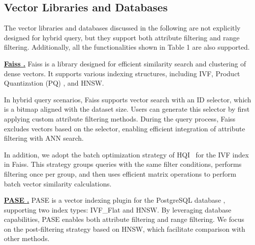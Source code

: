 \documentclass[sigconf, nonacm]{acmart}
\begin{document}
	
	
	\subsection{Vector Libraries and Databases}
	
	The vector libraries and databases discussed in the following are not explicitly designed for hybrid query, but they support both attribute filtering and range filtering. Additionally, all the functionalities shown in Table 1 are also supported.
	
	
	\noindent\textbf{\underline{Faiss \cite{Faiss}.}} Faiss is a library designed for efficient similarity search and clustering of dense vectors. It supports various indexing structures, including IVF, Product Quantization (PQ) \cite{PQ}, and HNSW.
	
	In hybrid query scenarios, Faiss supports vector search with an ID selector, which is a bitmap aligned with the dataset size. Users can generate this selector by first applying custom attribute filtering methods. During the query process, Faiss excludes vectors based on the selector, enabling efficient integration of attribute filtering with ANN search.
	
	In addition, we adopt the batch optimization strategy of HQI~\cite{HQI} for the IVF index in Faiss. This strategy groups queries with the same filter conditions, performs filtering once per group, and then uses efficient matrix operations to perform batch vector similarity calculations.
	
	
	\noindent\textbf{\underline{PASE \cite{pase}.}}  
	PASE is a vector indexing plugin for the PostgreSQL database \cite{postgresql13.4}, supporting two index types: IVF\_Flat \cite{johnson2019billion} and HNSW. By leveraging database capabilities, PASE enables both attribute filtering and range filtering. We focus on the post-filtering strategy based on HNSW, which facilitate comparison with other methods.
	
\end{document}
